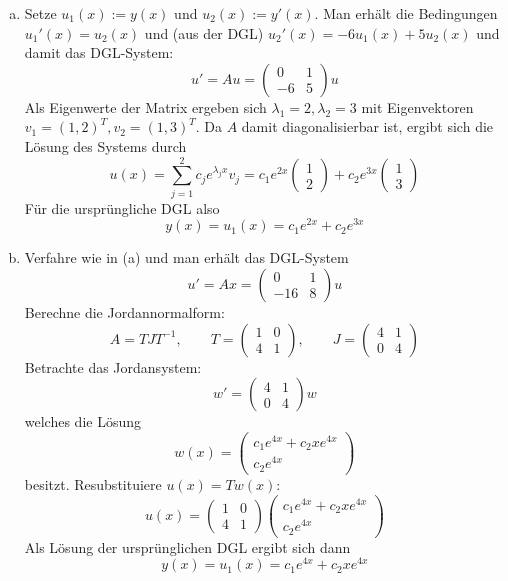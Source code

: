 \documentclass{mywork}
\begin{document}
\setcounter{section}{14}

\begin{aufgabe}
	\begin{enumerate}[(a)]
		\item
			Setze $u_1(x) := y(x)$ und $u_2(x) := y'(x)$.
			Man erhält die Bedingungen $u_1'(x) = u_2(x)$ und (aus der DGL) $u_2'(x) = -6 u_1(x) + 5 u_2(x)$ und damit das DGL-System:
			\[
				u' = Au = \begin{pmatrix}
					0 & 1 \\
					-6 & 5
				\end{pmatrix} u
			\]
			Als Eigenwerte der Matrix ergeben sich $\lambda_1 = 2, \lambda_2 = 3$ mit Eigenvektoren $v_1 = (1,2)^T, v_2 = (1,3)^T$.
			Da $A$ damit diagonalisierbar ist, ergibt sich die Lösung des Systems durch
			\[
				u(x) = \sum_{j=1}^2 c_j e^{\lambda_j x} v_j = c_1 e^{2x} \begin{pmatrix}
					1 \\
					2
				\end{pmatrix} + c_2e^{3x} \begin{pmatrix}
					1 \\
					3
				\end{pmatrix}
			\]
			Für die ursprüngliche DGL also
			\[
				y(x) = u_1(x) = c_1e^{2x} + c_2e^{3x}
			\]
		\item
			Verfahre wie in (a) und man erhält das DGL-System
			\[
				u' = Ax = \begin{pmatrix}
					0 & 1 \\
					-16 & 8
				\end{pmatrix} u
			\]
			Berechne die Jordannormalform:
			\[
				A = TJT^{-1},
				\qquad T = \begin{pmatrix}
					1 & 0 \\
					4 & 1
				\end{pmatrix},
				\qquad J = \begin{pmatrix}
					4 & 1 \\
					0 & 4
				\end{pmatrix}
			\]
			Betrachte das Jordansystem:
			\[
				w' = \begin{pmatrix}
					4 & 1 \\
					0 & 4
				\end{pmatrix} w
			\]
			welches die Lösung
			\[
				w(x) = \begin{pmatrix}
					c_1 e^{4x} + c_2 x e^{4x} \\
					c_2 e^{4x}
				\end{pmatrix}
			\]
			besitzt. Resubstituiere $u(x) = T w(x)$:
			\[
				u(x) = \begin{pmatrix}
					1 & 0 \\
					4 & 1
				\end{pmatrix} \begin{pmatrix}
					c_1 e^{4x} + c_2 x e^{4x} \\
					c_2 e^{4x}
				\end{pmatrix}
			\]
			Als Lösung der ursprünglichen DGL ergibt sich dann
			\[
				y(x) = u_1(x) = c_1 e^{4x} + c_2 x e^{4x}
			\]
	\end{enumerate}
\end{aufgabe}
\end{document}
